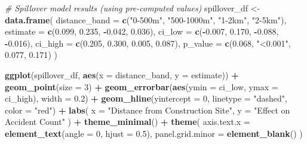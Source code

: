 \documentclass[
]{article}
\newenvironment{Shaded}{\begin{snugshade}}{\end{snugshade}}
\newcommand{\AttributeTok}[1]{\textcolor[rgb]{0.13,0.29,0.53}{#1}}
\newcommand{\CommentTok}[1]{\textcolor[rgb]{0.56,0.35,0.01}{\textit{#1}}}
\newcommand{\DecValTok}[1]{\textcolor[rgb]{0.00,0.00,0.81}{#1}}
\newcommand{\FloatTok}[1]{\textcolor[rgb]{0.00,0.00,0.81}{#1}}
\newcommand{\FunctionTok}[1]{\textcolor[rgb]{0.13,0.29,0.53}{\textbf{#1}}}
\newcommand{\NormalTok}[1]{#1}
\newcommand{\OtherTok}[1]{\textcolor[rgb]{0.56,0.35,0.01}{#1}}
\newcommand{\SpecialCharTok}[1]{\textcolor[rgb]{0.81,0.36,0.00}{\textbf{#1}}}
\newcommand{\StringTok}[1]{\textcolor[rgb]{0.31,0.60,0.02}{#1}}
\begin{document}
\begin{Shaded}
\begin{Highlighting}[]
\CommentTok{\# Spillover model results (using pre{-}computed values)}
\NormalTok{spillover\_df }\OtherTok{\textless{}{-}} \FunctionTok{data.frame}\NormalTok{(}
  \AttributeTok{distance\_band =} \FunctionTok{c}\NormalTok{(}\StringTok{"0{-}500m"}\NormalTok{, }\StringTok{"500{-}1000m"}\NormalTok{, }\StringTok{"1{-}2km"}\NormalTok{, }\StringTok{"2{-}5km"}\NormalTok{),}
  \AttributeTok{estimate =} \FunctionTok{c}\NormalTok{(}\FloatTok{0.099}\NormalTok{, }\FloatTok{0.235}\NormalTok{, }\SpecialCharTok{{-}}\FloatTok{0.042}\NormalTok{, }\FloatTok{0.036}\NormalTok{),}
  \AttributeTok{ci\_low =} \FunctionTok{c}\NormalTok{(}\SpecialCharTok{{-}}\FloatTok{0.007}\NormalTok{, }\FloatTok{0.170}\NormalTok{, }\SpecialCharTok{{-}}\FloatTok{0.088}\NormalTok{, }\SpecialCharTok{{-}}\FloatTok{0.016}\NormalTok{),}
  \AttributeTok{ci\_high =} \FunctionTok{c}\NormalTok{(}\FloatTok{0.205}\NormalTok{, }\FloatTok{0.300}\NormalTok{, }\FloatTok{0.005}\NormalTok{, }\FloatTok{0.087}\NormalTok{),}
  \AttributeTok{p\_value =} \FunctionTok{c}\NormalTok{(}\FloatTok{0.068}\NormalTok{, }\StringTok{"\textless{}0.001"}\NormalTok{, }\FloatTok{0.077}\NormalTok{, }\FloatTok{0.171}\NormalTok{)}
\NormalTok{)}

\FunctionTok{ggplot}\NormalTok{(spillover\_df, }\FunctionTok{aes}\NormalTok{(}\AttributeTok{x =}\NormalTok{ distance\_band, }\AttributeTok{y =}\NormalTok{ estimate)) }\SpecialCharTok{+}
  \FunctionTok{geom\_point}\NormalTok{(}\AttributeTok{size =} \DecValTok{3}\NormalTok{) }\SpecialCharTok{+}
  \FunctionTok{geom\_errorbar}\NormalTok{(}\FunctionTok{aes}\NormalTok{(}\AttributeTok{ymin =}\NormalTok{ ci\_low, }\AttributeTok{ymax =}\NormalTok{ ci\_high), }\AttributeTok{width =} \FloatTok{0.2}\NormalTok{) }\SpecialCharTok{+}
  \FunctionTok{geom\_hline}\NormalTok{(}\AttributeTok{yintercept =} \DecValTok{0}\NormalTok{, }\AttributeTok{linetype =} \StringTok{"dashed"}\NormalTok{, }\AttributeTok{color =} \StringTok{"red"}\NormalTok{) }\SpecialCharTok{+}
  \FunctionTok{labs}\NormalTok{(}
    \AttributeTok{x =} \StringTok{"Distance from Construction Site"}\NormalTok{,}
    \AttributeTok{y =} \StringTok{"Effect on Accident Count"}
\NormalTok{  ) }\SpecialCharTok{+}
  \FunctionTok{theme\_minimal}\NormalTok{() }\SpecialCharTok{+}
  \FunctionTok{theme}\NormalTok{(}
    \AttributeTok{axis.text.x =} \FunctionTok{element\_text}\NormalTok{(}\AttributeTok{angle =} \DecValTok{0}\NormalTok{, }\AttributeTok{hjust =} \FloatTok{0.5}\NormalTok{),}
    \AttributeTok{panel.grid.minor =} \FunctionTok{element\_blank}\NormalTok{()}
\NormalTok{  )}
\end{Highlighting}
\end{Shaded}
\end{document}
